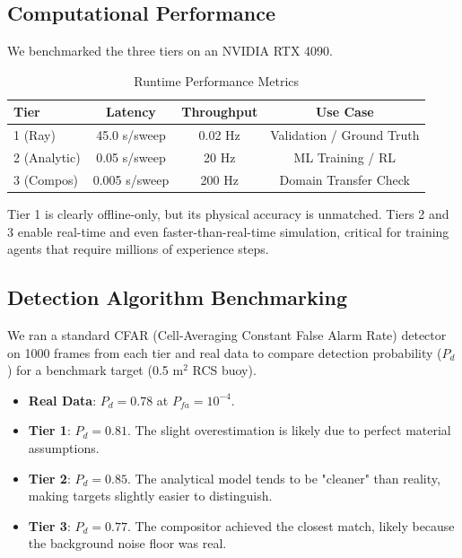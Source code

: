 \documentclass[conf]{new-aiaa}
\begin{document}
\subsection{Computational Performance}
We benchmarked the three tiers on an NVIDIA RTX 4090.
\begin{table}[h]
\centering
\caption{Runtime Performance Metrics}
\label{tab:perf}
\begin{tabular}{@{}lccc@{}}
\toprule
\textbf{Tier} & \textbf{Latency} & \textbf{Throughput} & \textbf{Use Case} \\ \midrule
1 (Ray) & 45.0 s/sweep & 0.02 Hz & Validation / Ground Truth \\
2 (Analytic) & 0.05 s/sweep & 20 Hz & ML Training / RL \\
3 (Compos) & 0.005 s/sweep & 200 Hz & Domain Transfer Check \\ \bottomrule
\end{tabular}
\end{table}
Tier 1 is clearly offline-only, but its physical accuracy is unmatched. Tiers 2 and 3 enable real-time and even faster-than-real-time simulation, critical for training agents that require millions of experience steps.

\subsection{Detection Algorithm Benchmarking}
We ran a standard CFAR (Cell-Averaging Constant False Alarm Rate) detector on 1000 frames from each tier and real data to compare detection probability ($P_d$) for a benchmark target (0.5 m$^2$ RCS buoy).
\begin{itemize}
    \item \textbf{Real Data}: $P_d = 0.78$ at $P_{fa} = 10^{-4}$.
    \item \textbf{Tier 1}: $P_d = 0.81$. The slight overestimation is likely due to perfect material assumptions.
    \item \textbf{Tier 2}: $P_d = 0.85$. The analytical model tends to be "cleaner" than reality, making targets slightly easier to distinguish.
    \item \textbf{Tier 3}: $P_d = 0.77$. The compositor achieved the closest match, likely because the background noise floor was real.
\end{itemize}
\end{document}
